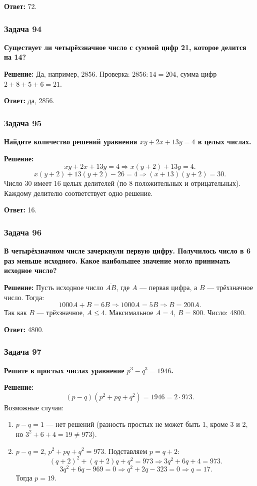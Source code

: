 \documentclass[12pt, a4paper]{article}
\begin{document}
\textbf{Ответ:} 72.

\subsubsection*{Задача 94}
\textbf{Существует ли четырёхзначное число с суммой цифр 21, которое делится на 14?}

\textbf{Решение:}
Да, например, $2856$. Проверка: $2856 : 14 = 204$, сумма цифр $2+8+5+6=21$.

\textbf{Ответ:} да, 2856.

\subsubsection*{Задача 95}
\textbf{Найдите количество решений уравнения $xy + 2x + 13y = 4$ в целых числах.}

\textbf{Решение:}
\[
xy + 2x + 13y = 4 \Rightarrow x(y+2) + 13y = 4.
\]
\[
x(y+2) + 13(y+2) - 26 = 4 \Rightarrow (x+13)(y+2) = 30.
\]
Число 30 имеет 16 целых делителей (по 8 положительных и отрицательных). Каждому делителю соответствует одно решение.

\textbf{Ответ:} 16.

\subsubsection*{Задача 96}
\textbf{В четырёхзначном числе зачеркнули первую цифру. Получилось число в 6 раз меньше исходного. Какое наибольшее значение могло принимать исходное число?}

\textbf{Решение:}
Пусть исходное число $\overline{AB}$, где $A$ — первая цифра, а $B$ — трёхзначное число. Тогда:
\[
1000A + B = 6B \Rightarrow 1000A = 5B \Rightarrow B = 200A.
\]
Так как $B$ — трёхзначное, $A \le 4$. Максимальное $A=4$, $B=800$. Число: 4800.

\textbf{Ответ:} 4800.

\subsubsection*{Задача 97}
\textbf{Решите в простых числах уравнение $p^3 - q^3 = 1946$.}

\textbf{Решение:}
\[
(p-q)(p^2 + pq + q^2) = 1946 = 2 \cdot 973.
\]
Возможные случаи:
\begin{enumerate}
    \item $p-q = 1$ — нет решений (разность простых не может быть 1, кроме 3 и 2, но $3^2+6+4=19 \neq 973$).
    \item $p-q = 2$, $p^2+pq+q^2 = 973$. Подставляем $p = q+2$:
    \[
    (q+2)^2 + (q+2)q + q^2 = 973 \Rightarrow 3q^2 + 6q + 4 = 973.
    \]
    \[
    3q^2 + 6q - 969 = 0 \Rightarrow q^2 + 2q - 323 = 0 \Rightarrow q = 17.
    \]
    Тогда $p = 19$.
\end{enumerate}
\end{document}
